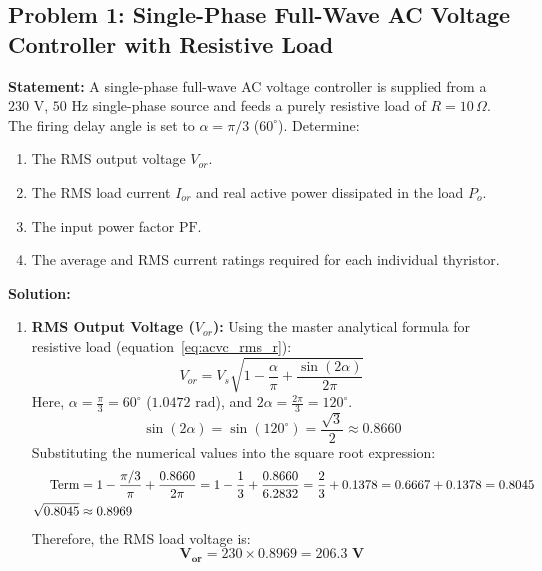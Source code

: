 \documentclass[11pt,a4paper]{article}
\let\origsubsection\subsection
\renewcommand{\subsection}{\Needspace{7\baselineskip}\origsubsection}
\begin{document}
\subsection{Problem 1: Single-Phase Full-Wave AC Voltage Controller with Resistive Load}
\begin{examplebox}
\textbf{Statement:} A single-phase full-wave AC voltage controller is supplied from a $230\text{ V}$, $50\text{ Hz}$ single-phase source and feeds a purely resistive load of $R = 10\,\Omega$. The firing delay angle is set to $\alpha = \pi/3$ ($60^\circ$). Determine:
\begin{enumerate}
  \item The RMS output voltage $V_{or}$.
  \item The RMS load current $I_{or}$ and real active power dissipated in the load $P_o$.
  \item The input power factor $\text{PF}$.
  \item The average and RMS current ratings required for each individual thyristor.
\end{enumerate}

\tcblower
\textbf{Solution:}
\begin{enumerate}
  \item \textbf{RMS Output Voltage ($V_{or}$):}
  Using the master analytical formula for resistive load (equation~\eqref{eq:acvc_rms_r}):
  \begin{equation*}
  V_{or} = V_s \sqrt{1 - \frac{\alpha}{\pi} + \frac{\sin(2\alpha)}{2\pi}}
  \end{equation*}
  Here, $\alpha = \frac{\pi}{3} = 60^\circ$ ($1.0472\text{ rad}$), and $2\alpha = \frac{2\pi}{3} = 120^\circ$.
  \begin{equation*}
  \sin(2\alpha) = \sin(120^\circ) = \frac{\sqrt{3}}{2} \approx 0.8660
  \end{equation*}
  Substituting the numerical values into the square root expression:
  \begin{align*}
  \text{Term} &= 1 - \frac{\pi/3}{\pi} + \frac{0.8660}{2\pi} = 1 - \frac{1}{3} + \frac{0.8660}{6.2832} = \frac{2}{3} + 0.1378 = 0.6667 + 0.1378 = 0.8045 \notag\\
  \sqrt{0.8045} &\approx 0.8969
  \end{align*}
  Therefore, the RMS load voltage is:
  \begin{equation*}
  \mathbf{V_{or}} = 230 \times 0.8969 = \mathbf{206.3\text{ V}}
  \end{equation*}


\end{enumerate}
\end{examplebox}
\end{document}
